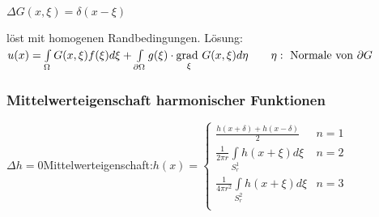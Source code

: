 $\Delta G(x,\xi)=\delta(x-\xi)$

löst mit homogenen Randbedingungen.
Lösung: $u(x)=\int\limits_{\Omega}^{}{G(x,\xi)f(\xi)d\xi}+\int\limits_{\partial\Omega}g(\xi)\cdot\underset{\xi}{\mathrm{grad~}}G(x,\xi)d\eta\qquad \eta:\text{ Normale von }\partial G$

\subsubsection{Mittelwerteigenschaft harmonischer Funktionen}

$\Delta h=0$\qquad Mittelwerteigenschaft:\qquad $h(x)=
\begin{cases}
	\frac{h(x+\delta)+h(x-\delta)}{2}& n=1 \\ 
	\frac 1{2\pi r} \int\limits_{S_r^1}{h(x+\xi)d\xi} & n=2\\
	\frac 1{4\pi r^2} \int\limits_{S_r^2}{h(x+\xi)d\xi} & n=3\\
\end{cases}$